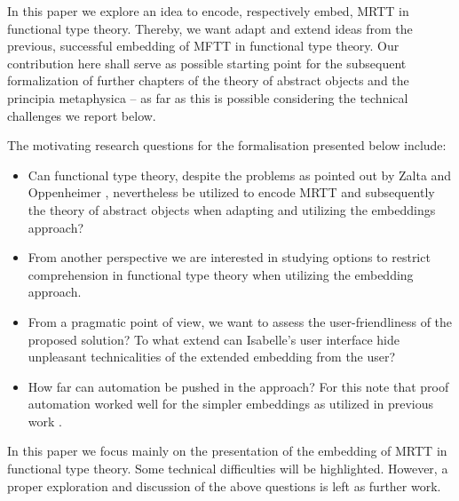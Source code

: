 \begin{isabellebody}
\begin{isamarkuptext}
  In this paper we explore an idea to encode, respectively embed,  MRTT in functional type theory. 
  Thereby, we want adapt and extend ideas from the previous, successful embedding of MFTT in functional 
  type theory.
  Our contribution here shall serve as possible starting point for the subsequent
  formalization of further chapters of the theory of abstract objects and the principia 
  metaphysica -- as far as this is possible considering the technical challenges we report below. 

 
  The motivating research questions for the formalisation presented below include:
  \begin{itemize} 
  \item Can functional type theory, despite the problems as pointed 
   out by Zalta and
   Oppenheimer \cite{zalta11:_relat_versus_funct_found_logic}, 
   nevertheless be utilized to encode MRTT and subsequently the theory of abstract 
   objects when adapting and utilizing the embeddings approach? 
  \item From another perspective we are interested in studying options to restrict comprehension in 
   functional type theory when utilizing the embedding approach.
  \item From a pragmatic point of view, we want to assess the user-friendliness of 
   the proposed solution? 
   To what extend can Isabelle's  user interface hide 
   unpleasant technicalities of the extended embedding from the user?
  \item How far can automation be pushed in the approach? For this note that proof automation 
    worked  well for the simpler embeddings as utilized in previous work \cite{C40,C55}. 
  \end{itemize}

  In this paper we focus mainly on the presentation of the embedding of MRTT in functional type theory.
  Some technical difficulties will be highlighted. However, a proper exploration and discussion of 
  the above questions is left as further work.
 



\end{isamarkuptext}
\end{isabellebody}
